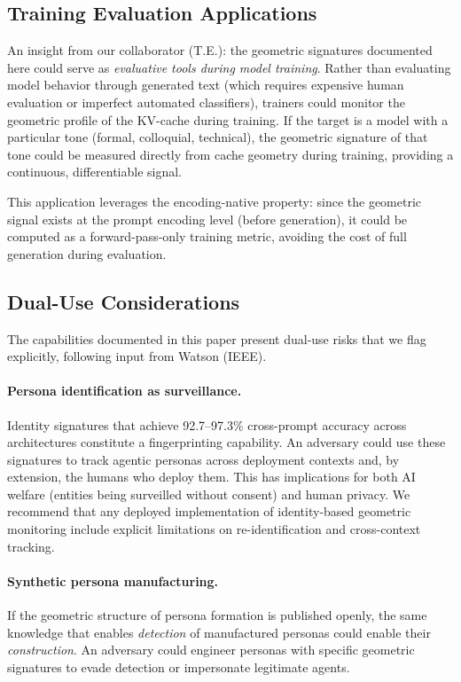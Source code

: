\documentclass[11pt,a4paper]{article}
\begin{document}
\subsection{Training Evaluation Applications}

An insight from our collaborator (T.E.): the geometric signatures documented here could serve as \emph{evaluative tools during model training}. Rather than evaluating model behavior through generated text (which requires expensive human evaluation or imperfect automated classifiers), trainers could monitor the geometric profile of the KV-cache during training. If the target is a model with a particular tone (formal, colloquial, technical), the geometric signature of that tone could be measured directly from cache geometry during training, providing a continuous, differentiable signal.

This application leverages the encoding-native property: since the geometric signal exists at the prompt encoding level (before generation), it could be computed as a forward-pass-only training metric, avoiding the cost of full generation during evaluation.

\subsection{Dual-Use Considerations}

The capabilities documented in this paper present dual-use risks that we flag explicitly, following input from Watson (IEEE).

\paragraph{Persona identification as surveillance.} Identity signatures that achieve 92.7--97.3\% cross-prompt accuracy across architectures constitute a fingerprinting capability. An adversary could use these signatures to track agentic personas across deployment contexts and, by extension, the humans who deploy them. This has implications for both AI welfare (entities being surveilled without consent) and human privacy. We recommend that any deployed implementation of identity-based geometric monitoring include explicit limitations on re-identification and cross-context tracking.

\paragraph{Synthetic persona manufacturing.} If the geometric structure of persona formation is published openly, the same knowledge that enables \emph{detection} of manufactured personas could enable their \emph{construction}. An adversary could engineer personas with specific geometric signatures to evade detection or impersonate legitimate agents.
\end{document}
